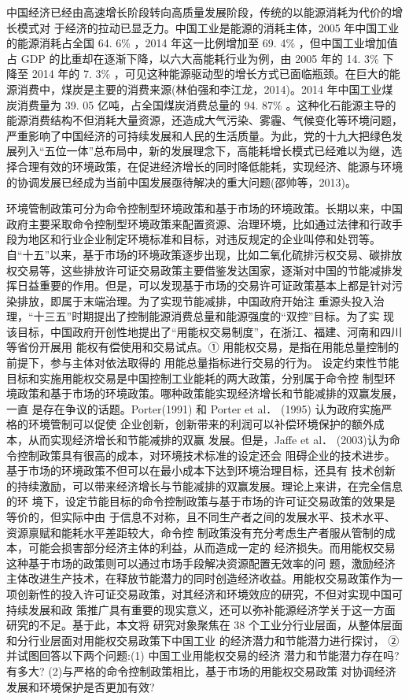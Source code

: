 \documentclass{ERJ}
\begin{document}
中国经济已经由高速增长阶段转向高质量发展阶段，传统的以能源消耗为代价的增长模式对
于经济的拉动已显乏力。中国工业是能源的消耗主体，2005 年中国工业的能源消耗占全国
64. 6\% ，2014 年这一比例增加至 69. 4\% ，但中国工业增加值占 GDP 的比重却在逐渐下降，以六大高能耗行业为例，由 2005 年的 14. 3\% 下降至 2014 年的 7. 3\% ，可见这种能源驱动型的增长方式已面临瓶颈。在巨大的能源消费中，煤炭是主要的消费来源(林伯强和李江龙，2014)。2014 年中国工业煤炭消费量为 39. 05 亿吨，占全国煤炭消费总量的 94. 87\% 。这种化石能源主导的能源消费结构不但消耗大量资源，还造成大气污染、雾霾、气候变化等环境问题，严重影响了中国经济的可持续发展和人民的生活质量。为此，党的十九大把绿色发展列入“五位一体”总布局中，新的发展理念下，高能耗增长模式已经难以为继，选择合理有效的环境政策，在促进经济增长的同时降低能耗，实现经济、能源与环境的协调发展已经成为当前中国发展亟待解决的重大问题(邵帅等，2013)。

环境管制政策可分为命令控制型环境政策和基于市场的环境政策。长期以来，中国政府主要采取命令控制型环境政策来配置资源、治理环境，比如通过法律和行政手段为地区和行业企业制定环境标准和目标，对违反规定的企业叫停和处罚等。自“十五”以来，基于市场的环境政策逐步出现，比如二氧化硫排污权交易、碳排放权交易等，这些排放许可证交易政策主要借鉴发达国家，逐渐对中国的节能减排发挥日益重要的作用。但是，可以发现基于市场的交易许可证政策基本上都是针对污染排放，即属于末端治理。为了实现节能减排，中国政府开始注
重源头投入治理，“十三五”时期提出了控制能源消费总量和能源强度的“双控”目标。为了实
现该目标，中国政府开创性地提出了“用能权交易制度”，在浙江、福建、河南和四川等省份开展用
能权有偿使用和交易试点。① 用能权交易，是指在用能总量控制的前提下，参与主体对依法取得的
用能总量指标进行交易的行为。
设定约束性节能目标和实施用能权交易是中国控制工业能耗的两大政策，分别属于命令控
制型环境政策和基于市场的环境政策。哪种政策能实现经济增长和节能减排的双赢发展，一直
是存在争议的话题。Porter(1991) 和 Porter et al． (1995) 认为政府实施严格的环境管制可以促使
企业创新，创新带来的利润可以补偿环境保护的额外成本，从而实现经济增长和节能减排的双赢
发展。但是，Jaffe et al． (2003)认为命令控制政策具有很高的成本，对环境技术标准的设定还会
阻碍企业的技术进步。基于市场的环境政策不但可以在最小成本下达到环境治理目标，还具有
技术创新的持续激励，可以带来经济增长与节能减排的双赢发展。理论上来讲，在完全信息的环
境下，设定节能目标的命令控制政策与基于市场的许可证交易政策的效果是等价的，但实际中由
于信息不对称，且不同生产者之间的发展水平、技术水平、资源禀赋和能耗水平差距较大，命令控
制政策没有充分考虑生产者服从管制的成本，可能会损害部分经济主体的利益，从而造成一定的
经济损失。而用能权交易这种基于市场的政策则可以通过市场手段解决资源配置无效率的问
题，激励经济主体改进生产技术，在释放节能潜力的同时创造经济收益。用能权交易政策作为一
项创新性的投入许可证交易政策，对其经济和环境效应的研究，不但对实现中国可持续发展和政
策推广具有重要的现实意义，还可以弥补能源经济学关于这一方面研究的不足。基于此，本文将
研究对象聚焦在 38 个工业分行业层面，从整体层面和分行业层面对用能权交易政策下中国工业
的经济潜力和节能潜力进行探讨， ② 并试图回答以下两个问题:(1) 中国工业用能权交易的经济
潜力和节能潜力存在吗? 有多大? (2)与严格的命令控制政策相比，基于市场的用能权交易政策
对协调经济发展和环境保护是否更加有效?
\end{document}
